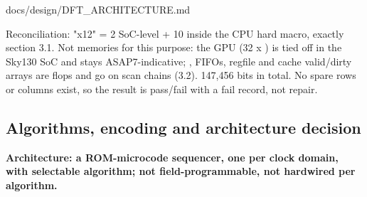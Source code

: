 \begin{relocated}{docs/design/DFT_ARCHITECTURE.md}
\begin{landscape}
\end{landscape}

Reconciliation: "x12" = 2 SoC-level + 10 inside the CPU hard macro,
exactly section 3.1. Not memories for this purpose: the GPU
 (32 x ) is tied off in
the Sky130 SoC and stays ASAP7-indicative; ,
FIFOs, regfile and cache valid/\allowbreak{}dirty arrays are flops and
go on scan chains (3.2). 147,456 bits in total. No spare rows or columns
exist, so the result is pass/fail with a fail record, not repair.

\subsection{Algorithms, encoding and architecture decision}\label{tm:ch:dft-architecture:162-algorithms-encoding-and-architecture-decision}

\textbf{Architecture: a ROM-microcode sequencer, one per clock domain,
with selectable algorithm; not field-programmable, not hardwired per
algorithm.}

{\footnotesize\setlength{\tabcolsep}{3pt}

}
\end{relocated}
